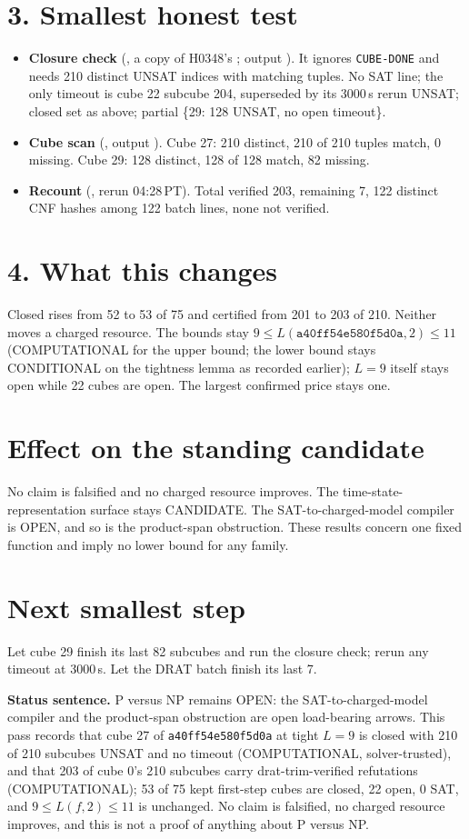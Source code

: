 \documentclass[11pt]{article}
\begin{document}
\section*{3. Smallest honest test}
\begin{itemize}
\item \textbf{Closure check} (, a copy of H0348's ; output ). It ignores \texttt{CUBE-DONE} and needs 210 distinct UNSAT indices with matching tuples. No SAT line; the only timeout is cube 22 subcube 204, superseded by its 3000\,s rerun UNSAT; closed set as above; partial \{29: 128 UNSAT, no open timeout\}.
\item \textbf{Cube scan} (, output ). Cube 27: 210 distinct, 210 of 210 tuples match, 0 missing. Cube 29: 128 distinct, 128 of 128 match, 82 missing.
\item \textbf{Recount} (, rerun 04:28\,PT). Total verified 203, remaining 7, 122 distinct CNF hashes among 122 batch lines, none not verified.
\end{itemize}

\section*{4. What this changes}
Closed rises from 52 to 53 of 75 and certified from 201 to 203 of 210. Neither moves a charged resource. The bounds stay $9\le L(\texttt{a40ff54e580f5d0a},2)\le 11$ (COMPUTATIONAL for the upper bound; the lower bound stays CONDITIONAL on the tightness lemma as recorded earlier); $L=9$ itself stays open while 22 cubes are open. The largest confirmed price stays one.

\section*{Effect on the standing candidate}
No claim is falsified and no charged resource improves. The time-state-representation surface stays CANDIDATE. The SAT-to-charged-model compiler is OPEN, and so is the product-span obstruction. These results concern one fixed function and imply no lower bound for any family.

\section*{Next smallest step}
Let cube 29 finish its last 82 subcubes and run the closure check; rerun any timeout at 3000\,s. Let the DRAT batch finish its last 7.

\bigskip
\noindent\textbf{Status sentence.} P versus NP remains OPEN: the SAT-to-charged-model compiler and the product-span obstruction are open load-bearing arrows. This pass records that cube 27 of \texttt{a40ff54e580f5d0a} at tight $L=9$ is closed with 210 of 210 subcubes UNSAT and no timeout (COMPUTATIONAL, solver-trusted), and that 203 of cube 0's 210 subcubes carry drat-trim-verified refutations (COMPUTATIONAL); 53 of 75 kept first-step cubes are closed, 22 open, 0 SAT, and $9\le L(f,2)\le 11$ is unchanged. No claim is falsified, no charged resource improves, and this is not a proof of anything about P versus NP.
\end{document}
